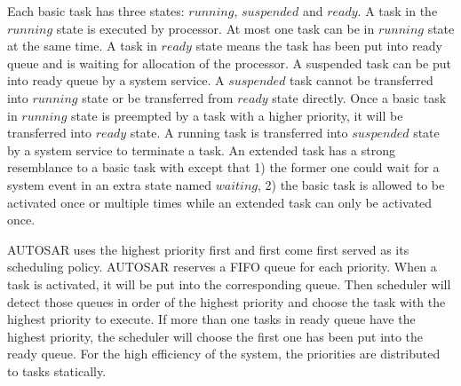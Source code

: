 \documentclass[10pt,conference]{IEEEtran}
\begin{document}
Each basic task has three states: $running$, $suspended$ and $ready$. A task in the $running$ state is executed by processor. %
At most one task can be in $running$ state at the same time. A task in $ready$ state means the task has been put into ready queue and is waiting for allocation of the processor. A suspended task can be put into ready queue by a system service. A $suspended$ task cannot be transferred into $running$ state or be transferred from $ready$ state directly. Once a basic task in $running$ state is preempted by a task with a higher priority, it will be transferred into $ready$ state. A running task is transferred into $suspended$ state by a system service to terminate a task. An extended task has a strong resemblance to a basic task with except that 1) the former one could wait for a system event in an extra state named $waiting$, 2) the basic task is allowed to be activated once or multiple times while an extended task can only be activated once. 

AUTOSAR uses the highest priority first and first come first served as its scheduling policy. AUTOSAR reserves a FIFO queue for each priority. When a task is activated, it will be put into the corresponding queue. Then scheduler will detect those queues in order of the highest priority and choose the task with the highest priority to execute. If more than one tasks in ready queue have the highest priority, the scheduler will choose the first one has been put into the ready queue. For the high efficiency of the system, the priorities are distributed to tasks statically.
\end{document}
